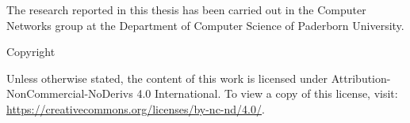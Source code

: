 \thispagestyle{empty}

\thetitle{}

\theauthor{}

The research reported in this thesis has been carried out in the Computer Networks group at the Department of Computer Science of Paderborn University. 

\vspace*{\fill}

Copyright \textcopyright \the\year{} \theauthor{}

\ccbyncndeu 

Unless otherwise stated, the content of this work is licensed under Attribution-NonCommercial-NoDerivs 4.0 International. To view a copy of this license, visit: \href{https://creativecommons.org/licenses/by-nc-nd/4.0/}{https://creativecommons.org/licenses/by-nc-nd/4.0/}.